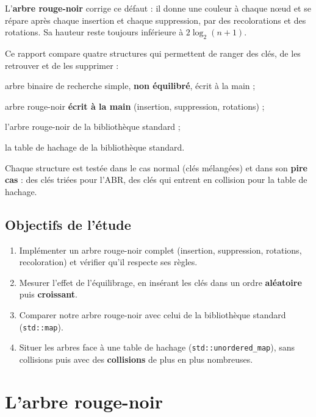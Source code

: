 \documentclass[12pt,a4paper]{report}
\begin{document}
L'\textbf{arbre rouge-noir} corrige ce défaut : il donne une couleur à chaque nœud et se répare après chaque insertion et chaque suppression, par des recolorations et des rotations. Sa hauteur reste toujours inférieure à $2\log_2(n+1)$.

Ce rapport compare quatre structures qui permettent de ranger des clés, de les retrouver et de les supprimer :
\begin{description}[leftmargin=0.5cm, style=nextline]
  \item[ABR] arbre binaire de recherche simple, \textbf{non équilibré}, écrit à la main ;
  \item[Rouge-noir] arbre rouge-noir \textbf{écrit à la main} (insertion, suppression, rotations) ;
  \item[\texttt{std::map}] l'arbre rouge-noir de la bibliothèque standard ;
  \item[\texttt{std::unordered\_map}] la table de hachage de la bibliothèque standard.
\end{description}

Chaque structure est testée dans le cas normal (clés mélangées) et dans son \textbf{pire cas} : des clés triées pour l'ABR, des clés qui entrent en collision pour la table de hachage.

\subsection{Objectifs de l'étude}
\begin{enumerate}
  \item Implémenter un arbre rouge-noir complet (insertion, suppression, rotations, recoloration) et vérifier qu'il respecte ses règles.
  \item Mesurer l'effet de l'équilibrage, en insérant les clés dans un ordre \textbf{aléatoire} puis \textbf{croissant}.
  \item Comparer notre arbre rouge-noir avec celui de la bibliothèque standard (\texttt{std::map}).
  \item Situer les arbres face à une table de hachage (\texttt{std::unordered\_map}), sans collisions puis avec des \textbf{collisions} de plus en plus nombreuses.
\end{enumerate}

\section{L'arbre rouge-noir}
\end{document}
